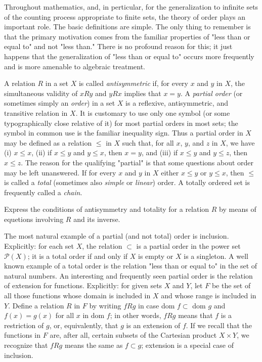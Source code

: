 
Throughout mathematics, and, in perticular, for the generalization to infinite sets of the counting process appropriate to finite sets, the theory of order plays an important role. The basic definitions are simple. The only thing to remember is that the primary motivation comes from the familiar properties of "less than or equal to" and not "less than." There is no profound reason for this; it just happens that the generalization of "less than or equal to" occurs more frequently and is more amenable to algebraic treatment. 

A relation $R$ in a set $X$ is called \textit{antisymmetric} if, for every $x$ and $y$ in $X$, the simultaneous validity of $xRy$ and $yRx$ implies that $x = y$. A \textit{partial order} (or sometimes simply an \textit{order}) in a set $X$ is a reflexive, antisymmetric, and transitive relation in $X$. It is customary to use only one symbol (or some typographically close relative of it) for most partial orders in most sets; the symbol in common use is the familiar inequality sign. Thus a partial order in $X$ may be defined as a relation $\le$ in $X$ such that, for all $x$, $y$, and $z$ in $X$, we have (i) $x \le x$, (ii) if $x \le y$ and $y \le x$, then $x = y$, and (iii) if $x \le y$ and $y \le z$, then $x \le z$. The reason for the qualifying "partial" is that some questions about order may be left unanswered. If for every $x$ and $y$ in $X$ either $x \le y$ or $y \le x$, then $\le$ is called a \textit{total} (sometimes also \textit{simple} or \textit{linear}) order. A totally ordered set is frequently called a \textit{chain}. 

\begin{exercise} Express the conditions of antisymmetry and totality for a relation $R$ by means of equetions involving $R$ and its inverse. 
\end{exercise}

The most natural example of a partial (and not total) order is inclusion. Explicitly: for each set $X$, the relation $\subset$ is a partial order in the power set $\mathcal{P}(X)$; it is a total order if and only if $X$ is empty or $X$ is a singleton. A well known example of a total order is the relation "less than or equal to" in the set of natural numbers. An interesting and frequently seen partial order is the relation of extension for functions. Explicitly: for given sets $X$ and $Y$, let $F$ be the set of all those functions whose domain is included in $X$ and whose range is included in $Y$. Define a relation $R$ in $F$ by writing $fRg$ in case dom $f \subset$ dom $g$ and $f(x) = g(x)$ for all $x$ in dom $f$; in other words, $fRg$ means that $f$ is a restriction of $g$, or, equivalently, that $g$ is an extension of $f$. If we recall that the functions in $F$ are, after all, certain subsets of the Cartesian product $X \times Y$, we recognize that $fRg$ means the same as $f \subset g$; extension is a special case of inclusion.


